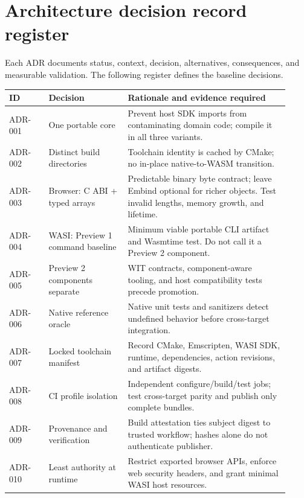 \documentclass[11pt,letterpaper]{article}
\begin{document}
\section{Architecture decision record register}
Each ADR documents status, context, decision, alternatives, consequences, and measurable validation. The following register defines the baseline decisions.
\begin{longtable}{p{0.13\linewidth}p{0.26\linewidth}p{0.53\linewidth}}
\toprule ID & Decision & Rationale and evidence required \\ \midrule \endhead
ADR-001 & One portable core & Prevent host SDK imports from contaminating domain code; compile it in all three variants. \\
ADR-002 & Distinct build directories & Toolchain identity is cached by CMake; no in-place native-to-WASM transition. \\
ADR-003 & Browser: C ABI + typed arrays & Predictable binary byte contract; leave Embind optional for richer objects. Test invalid lengths, memory growth, and lifetime. \\
ADR-004 & WASI: Preview 1 command baseline & Minimum viable portable CLI artifact and Wasmtime test. Do not call it a Preview 2 component. \\
ADR-005 & Preview 2 components separate & WIT contracts, component-aware tooling, and host compatibility tests precede promotion. \\
ADR-006 & Native reference oracle & Native unit tests and sanitizers detect undefined behavior before cross-target integration. \\
ADR-007 & Locked toolchain manifest & Record CMake, Emscripten, WASI SDK, runtime, dependencies, action revisions, and artifact digests. \\
ADR-008 & CI profile isolation & Independent configure/build/test jobs; test cross-target parity and publish only complete bundles. \\
ADR-009 & Provenance and verification & Build attestation ties subject digest to trusted workflow; hashes alone do not authenticate publisher. \\
ADR-010 & Least authority at runtime & Restrict exported browser APIs, enforce web security headers, and grant minimal WASI host resources. \\
\bottomrule
\end{longtable}
\end{document}
